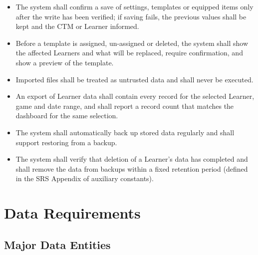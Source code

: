 \documentclass[12pt]{article}
\begin{document}
\begin{itemize}
    \item[\textbf{SR-13.}\phantomsection\label{SR-13}] The system shall confirm a save of settings, templates or equipped items only after the write has been verified; if saving fails, the previous values shall be kept and the CTM or Learner informed.
    \item[\textbf{SR-14.}\phantomsection\label{SR-14}] Before a template is assigned, un-assigned or deleted, the system shall show the affected Learners and what will be replaced, require confirmation, and show a preview of the template.
    \item[\textbf{SR-15.}\phantomsection\label{SR-15}] Imported files shall be treated as untrusted data and shall never be executed.
    \item[\textbf{SR-16.}\phantomsection\label{SR-16}] An export of Learner data shall contain every record for the selected Learner, game and date range, and shall report a record count that matches the dashboard for the same selection.
    \item[\textbf{SR-17.}\phantomsection\label{SR-17}] The system shall automatically back up stored data regularly and shall support restoring from a backup.
    \item[\textbf{SR-18.}\phantomsection\label{SR-18}] The system shall verify that deletion of a Learner's data has completed and shall remove the data from backups within a fixed retention period (defined in the SRS Appendix of auxiliary constants).
\end{itemize}

\section{Data Requirements}

\subsection{Major Data Entities}
\end{document}
